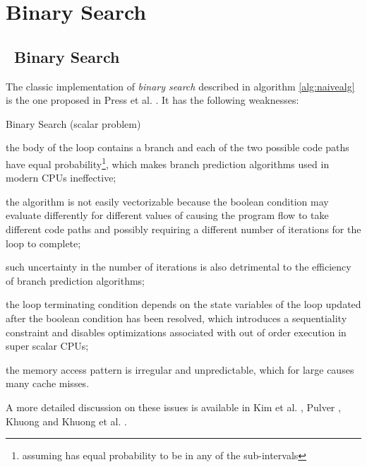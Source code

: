 \documentclass[preprint,1p,times]{elsarticle}
\begin{document}
\section{Binary Search}


\subsection{\ClassicName\ Binary Search}
\label{sec:binary}

The classic implementation of \textit{binary search} described in algorithm \ref{alg:naivealg} is the one proposed in Press et al. \cite{NRC++}. It has the following weaknesses: 

\begin{algorithm}
\caption{{\ClassicName}  Binary Search (scalar problem)}
\label{alg:naivealg}
\begin{algorithmic}
\Function {\ClassicName}{\fin ,  , \fout }
\State 
\State 
\While {} 
    \State 
    \If {}  
        \State 
    \Else
        \State 
    \EndIf
\EndWhile
\State 
\EndFunction
\end{algorithmic}
\end{algorithm}

\begin{myitemize}
	\item the body of the loop contains a branch and each of the two possible code paths have equal probability\footnote{assuming  has equal probability to be in any of the sub-intervals }, which makes branch prediction algorithms used in modern CPUs ineffective; 
	\item the algorithm is not easily vectorizable because the boolean condition  may evaluate differently for different values of  causing the program flow to take different code paths and possibly requiring a different number of iterations for the loop to complete;
	\item such uncertainty in the number of iterations is also detrimental to the efficiency of branch prediction algorithms;
    \item the loop terminating condition depends on the state variables of the loop updated after the boolean condition has been resolved, which introduces a sequentiality constraint and disables optimizations associated with out of order execution in super scalar CPUs;
    \item the memory access pattern is irregular and unpredictable, which for large  causes many cache misses.
\end{myitemize}
A more detailed discussion on these issues is available in Kim et al. \cite{Kim2011}, Pulver \cite{Pulver2011}, Khuong \cite{Khuong2012} and Khuong et al. \cite{Morin2015}.
\end{document}
